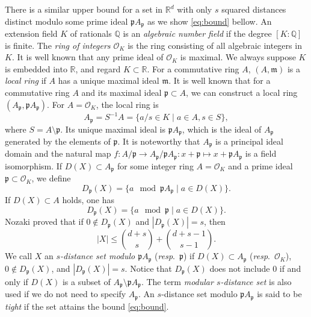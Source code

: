 \documentclass[a4paper, 11pt]{article}
\newcommand{\R}{\mathbb{R}}
\newcommand{\p}{\mathfrak{p}}
\theoremstyle{definition}
\begin{document}
There is a similar upper bound for a set in $\R^d$ with only $s$ squared distances distinct modulo some prime ideal $\p A_\p$ as we show \eqref{eq:bound} bellow.    
An extension field $K$ of rationals $\mathbb{Q}$ is an {\it algebraic number field} if the degree $[K:\mathbb{Q}]$ is finite.  
The {\it ring of integers $\mathcal{O}_K$} is the ring consisting of all algebraic integers in $K$.  
It is well known that any prime ideal of $\mathcal{O}_K$ is maximal. 
We always suppose $K$ is embedded into $\mathbb{R}$, and regard $K \subset \mathbb{R}$.  
For a commutative ring $A$, $(A,\mathfrak{m})$ is a {\it local ring} if $A$ has a unique maximal ideal $\mathfrak{m}$. 
It is well known that for a commutative ring $A$ and its maximal ideal $\mathfrak{p}\subset A$, we can construct a local ring $(A_{\mathfrak{p}}, \mathfrak{p} A_{\mathfrak{p}})$.  
For $A=\mathcal{O}_K$, the local ring is 
\[
A_\mathfrak{p}=S^{-1} A=\{a/s \in K \mid a \in A, s \in S\},
\]
where $S=A \setminus \mathfrak{p}$. 
Its unique maximal ideal is $\mathfrak{p} A_{\mathfrak{p}}$, which is the ideal of 
$A_{\mathfrak{p}}$ generated by the elements of $\mathfrak{p}$. It is noteworthy that $A_\mathfrak{p}$ is a principal ideal domain and the natural map $f: A/\mathfrak{p} \rightarrow A_\mathfrak{p}/ \mathfrak{p} A_\mathfrak{p}: x+\p \mapsto x+\p A_\p$ is a field isomorphism. 
If $D(X) \subset A_\mathfrak{p}$ for some integer ring $A=\mathcal{O}_K$ and a prime ideal $\mathfrak{p} \subset \mathcal{O}_K$, we define 
\[
D_{\mathfrak{p}}(X) = \{a \mod{\mathfrak{p}A_{\mathfrak{p}}} \mid a \in D(X)\}. 
\]
If $D(X) \subset A$ holds, one has 
\[
D_{\mathfrak{p}}(X) = \{a \mod{\mathfrak{p}} \mid a \in D(X)\}. 
\]
Nozaki \cite{NX} proved that if $0 \not\in D_{\p}(X)$ and $|D_{\p}(X)|=s$, then 
\begin{equation} \label{eq:bound}
|X| \leq \binom{d+s}{s}+\binom{d+s-1}{s-1}. 
\end{equation} 
We call $X$ an {\it $s$-distance set modulo $\mathfrak{p}A_\mathfrak{p}$} ({\it resp}.\ $\mathfrak{p}$)
if $D(X)\subset A_\p$ ({\it resp}.\ $\mathcal{O}_K$), $0 \not\in D_\p(X)$, and $|D_\p(X)|=s$. 
Notice that $D_\p(X)$ does not include $0$ if and only if $D(X)$ is a subset of $A_\p \setminus \p A_\p$. 
The term {\it modular $s$-distance set} is also used if we do not need to specify $A_\p$.  
 An $s$-distance set modulo $\p A_\p$ is said to be {\it tight} if the set attains the bound \eqref{eq:bound}. 
\end{document}
